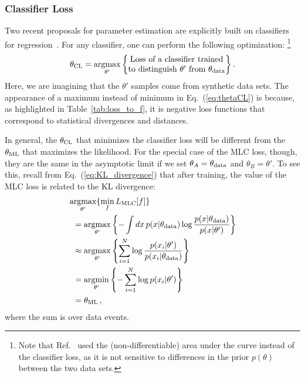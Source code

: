 \documentclass[aps,prx,reprint,preprintnumbers,superscriptaddress,nofootinbib,longbibliography,floatfix]{revtex4-2}
\DeclareMathOperator*{\argmax}{argmax}
\DeclareMathOperator*{\argmin}{argmin}
\newcommand{\thetaup}{\theta_A}
\newcommand{\thetadown}{\theta_B}
\newcommand{\thetadata}{\theta_{\rm data}}
\newcommand{\thetaCL}{\theta_{\rm CL}}
\newcommand{\thetaML}{\theta_{\rm ML}}
\DeclareRobustCommand{\Tab}[1]{Table~\ref{tab:#1}}
\DeclareRobustCommand{\Eq}[1]{Eq.~(\ref{eq:#1})}
\DeclareRobustCommand{\Ref}[1]{Ref.~\cite{#1}}
\begin{document}
\subsubsection{Classifier Loss}
%
Two recent proposals for parameter estimation are explicitly built on classifiers for regression~\cite{2010.03569,1907.08209}.
%
For any classifier, one can perform the following optimization:%
%
\footnote{Note that \Ref{2010.03569} used the (non-differentiable) area under the curve instead of the classifier loss, as it is not sensitive to differences in the prior $p(\theta)$ between the two data sets.}
%
\begin{align}
    \thetaCL =\argmax_{\theta'}\left\{\begin{matrix}\text{Loss of a classifier trained}\cr\text{to distinguish $\theta'$ from $\thetadata$}\end{matrix}\right\}.
    \label{eq:thetaCL}
\end{align}
%
Here, we are imagining that the $\theta'$ samples come from synthetic data sets.
%
The appearance of a maximum instead of minimum in \Eq{thetaCL} is because, as highlighted in \Tab{loss_to_f}, it is negative loss functions that correspond to statistical divergences and distances.


In general, the $\thetaCL$ that minimizes the classifier loss will be different from the $\thetaML$ that maximizes the likelihood.
%
For the special case of the MLC loss, though, they are the same in the asymptotic limit if we set $\thetaup = \thetadata$ and $\thetadown = \theta'$.
%
To see this, recall from \Eq{KL_divergence} that after training, the value of the MLC loss is related to the KL divergence: 
%
\begin{align}\nonumber
&\argmax_{\theta'}\{ \min_f L_\text{MLC}[f] \}\\\nonumber
&\hspace{2mm}=\argmax_{\theta'}\left\{ -\int dx \, p(x|\thetadata) \log \frac{p(x|\thetadata)}{p(x|\theta')}\right\}  \\\nonumber
&\hspace{2mm}\approx\argmax_{\theta'}\left\{ \sum_{i=1}^N \log \frac{p(x_i|\theta')}{p(x_i | \thetadata)} \right\}\\\nonumber
&\hspace{2mm}=\argmin_{\theta'}\left\{ -\sum_{i=1}^N \log p(x_i|\theta') \right\}\\
&\hspace{2mm}=\thetaML\,,
\label{eq:KL_divergence_alt}
\end{align}
%
where the sum is over data events.
\end{document}
